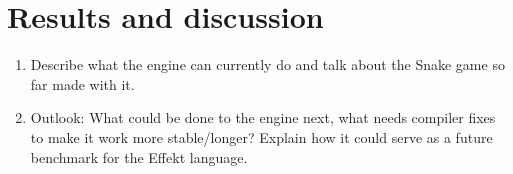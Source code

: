 \chapter{Results and discussion}

\begin{enumerate}
\item Describe what the engine can currently do and talk about the Snake game so far made with it.
\item Outlook: What could be done to the engine next, what needs compiler fixes to make it work more stable/longer? Explain how it could serve as a future benchmark for the Effekt language.
\end{enumerate}
